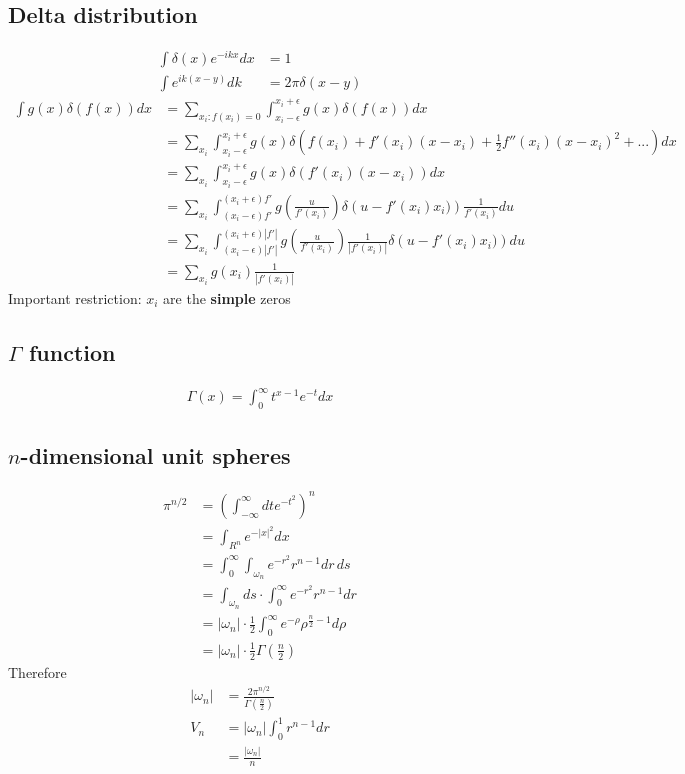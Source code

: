 \documentclass[10pt,a4paper]{article}
\theoremstyle{definition}
\begin{document}
\subsection{Delta distribution}
\begin{align}
    \int\delta(x)e^{-ikx}dx&=1\\
    \int e^{ik(x-y)}dk&=2\pi\delta(x-y)
\end{align}
\begin{align}
    \int g(x)\delta(f(x))dx &= \sum_{x_i:f(x_i)=0}\int_{x_i-\epsilon}^{x_i+\epsilon} g(x)\delta(f(x))dx\\
    &= \sum_{x_i}\int_{x_i-\epsilon}^{x_i+\epsilon} g(x)\delta\left(f(x_i)+f'(x_i)(x-x_i)+\frac{1}{2}f''(x_i)(x-x_i)^2+...\right)dx\\
    &= \sum_{x_i}\int_{x_i-\epsilon}^{x_i+\epsilon} g(x)\delta\left(f'(x_i)(x-x_i)\right)dx\\
    &= \sum_{x_i}\int_{(x_i-\epsilon)f'}^{(x_i+\epsilon)f'} g\left(\frac{u}{f'(x_i)}\right)\delta\left(u-f'(x_i)x_i)\right)\frac{1}{f'(x_i)}du\\
    &= \sum_{x_i}\int_{(x_i-\epsilon)|f'|}^{(x_i+\epsilon)|f'|} g\left(\frac{u}{f'(x_i)}\right)\frac{1}{|f'(x_i)|}\delta\left(u-f'(x_i)x_i)\right)du\\
    &= \sum_{x_i} g(x_i)\frac{1}{|f'(x_i)|}
\end{align}
Important restriction: $x_i$ are the {\bf simple} zeros

\subsection{\texorpdfstring{$\Gamma$}{TEXT} function}
\begin{align}
    \Gamma(x)=\int_0^\infty t^{x-1}e^{-t} dx
\end{align}

\subsection{\texorpdfstring{$n$}{TEXT}-dimensional unit spheres}
\begin{align}
    \pi^{n/2}
    &=\left(\int_{-\infty}^\infty dt e^{-t^2}\right)^n\\
    &=\int_{R^n} e^{-|x|^2}dx\\
    &=\int_0^\infty\int_{\omega_n}e^{-r^2}r^{n-1}dr\,ds\\
    &=\int_{\omega_n}ds\cdot\int_0^\infty e^{-r^2}r^{n-1}dr\\
    &=|\omega_n|\cdot\frac{1}{2}\int_0^\infty e^{-\rho}\rho^{\frac{n}{2}-1}d\rho\\
    &=|\omega_n|\cdot\frac{1}{2}\Gamma\left(\frac{n}{2}\right)
\end{align}
Therefore
\begin{align}
|\omega_n| &= \frac{2\pi^{n/2}}{\Gamma\left(\frac{n}{2}\right)}\\
V_n 
&=|\omega_n|\int_0^1r^{n-1}dr\\
&=\frac{|\omega_n|}{n}
\end{align}
\end{document}
